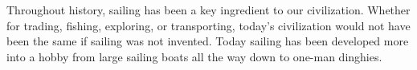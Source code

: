 Throughout history, sailing has been a key ingredient to our civilization. Whether for trading, fishing, exploring, or transporting, today's civilization would not have been the same if sailing was not invented. Today sailing has been developed more into a hobby from large sailing boats all the way down to one-man dinghies. 
\thispagestyle{empty}